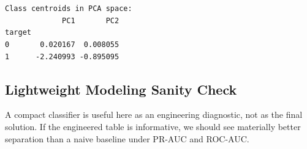 \documentclass[11pt]{article}
\begin{document}
    \begin{center}
    \end{center}
    { \hspace*{\fill} \\}
    
    \begin{center}
    \end{center}
    { \hspace*{\fill} \\}
    
    \begin{Verbatim}[commandchars=\\\{\}]
Class centroids in PCA space:
             PC1       PC2
target
0       0.020167  0.008055
1      -2.240993 -0.895095
    \end{Verbatim}

    \subsection{Lightweight Modeling Sanity
Check}\label{lightweight-modeling-sanity-check}

A compact classifier is useful here as an engineering diagnostic, not as
the final solution. If the engineered table is informative, we should
see materially better separation than a naive baseline under PR-AUC and
ROC-AUC.
\end{document}
